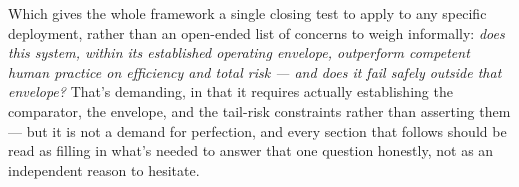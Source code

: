 Which gives the whole framework a single closing test to apply to any specific deployment, rather than an open-ended list of concerns to weigh informally: \emph{does this system, within its established operating envelope, outperform competent human practice on efficiency and total risk --- and does it fail safely outside that envelope?} That's demanding, in that it requires actually establishing the comparator, the envelope, and the tail-risk constraints rather than asserting them --- but it is not a demand for perfection, and every section that follows should be read as filling in what's needed to answer that one question honestly, not as an independent reason to hesitate.
